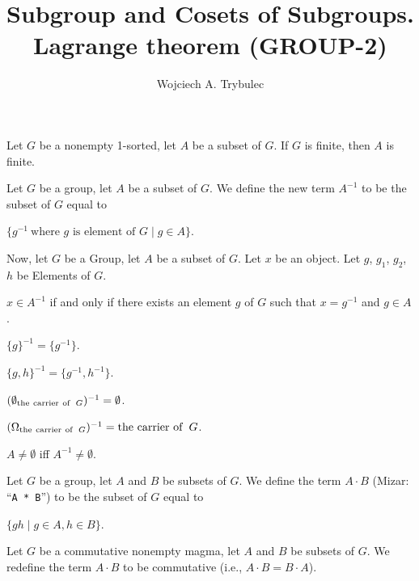 \documentclass{article}
\title{Subgroup and Cosets of Subgroups. Lagrange theorem (GROUP-2)}
\author{Wojciech A. Trybulec}
\begin{document}
\maketitle

\begin{thm}
\item\label{group2:1} Let $G$ be a nonempty 1-sorted, let $A$ be a subset of $G$.
  If $G$ is finite, then $A$ is finite.
\end{thm}

\begin{definition}
Let $G$ be a group, let $A$ be a subset of $G$.
We define the new term $A^{-1}$ to be the subset of $G$ equal to
\begin{defn}
\item $\{g^{-1}~\mbox{where $g$ is element of $G$}\mid g\in A\}$.
\end{defn}
\end{definition}

Now, let $G$ be a Group, let $A$ be a subset of $G$. Let $x$ be an
object. Let $g$, $g_{1}$, $g_{2}$, $h$ be Elements of $G$.
\begin{thm}
\item\label{group2:2} $x\in A^{-1}$ if and only if there exists an
  element $g$ of $G$ such that $x=g^{-1}$ and $g\in A$.
\item\label{group2:3} $\{g\}^{-1}=\{g^{-1}\}$.
\item\label{group2:4} $\{g,h\}^{-1}=\{g^{-1},h^{-1}\}$.
\item\label{group2:5} $(\emptyset_{\operatorname{the\ carrier\ of\ }G})^{-1}=\emptyset$.
\item\label{group2:6} $(\Omega_{\operatorname{the\ carrier\ of\ }G})^{-1}=\operatorname{the\ carrier\ of\ }G$.
\item\label{group2:7} $A\neq\emptyset$ iff $A^{-1}\neq\emptyset$.
\end{thm}

\begin{definition}
Let $G$ be a group, let $A$ and $B$ be subsets of $G$.
We define the term $A\cdot B$ (Mizar: ``\verb#A * B#'') to be the subset of
$G$ equal to
\begin{defn}
\item $\{gh\mid g\in A,h\in B\}$.
\end{defn}
\end{definition}

\begin{definition}
Let $G$ be a commutative nonempty magma, let $A$ and $B$ be subsets of $G$.
We redefine the term $A\cdot B$ to be commutative
(i.e., $A\cdot B=B\cdot A$).
\end{definition}
\end{document}
